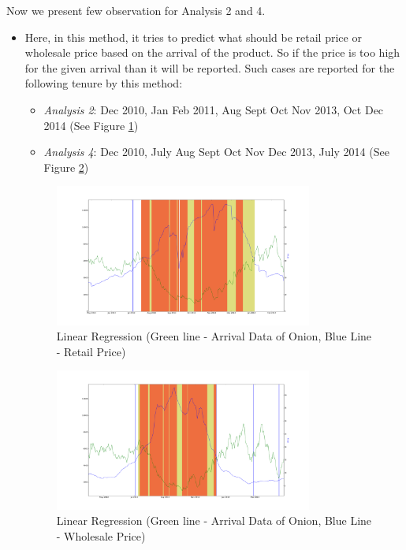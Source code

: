 \documentclass[a4paper,10pt]{report}
\begin{document}
		
		Now we present few observation for Analysis 2 and 4.
		
		
		\begin{itemize}
			\item Here, in this method, it tries to predict what should be retail price or wholesale price based on the arrival of the product. So if the price is too high for the given arrival than it will be reported.
			Such cases are reported for the following tenure by this method:
			\begin{itemize}
				\item \textit{Analysis 2}: Dec 2010, Jan Feb 2011, Aug Sept Oct Nov 2013, Oct Dec 2014 (See Figure \ref{fig:12221})
				\item \textit{Analysis 4}: Dec 2010, July Aug Sept Oct Nov Dec 2013, July 2014 (See Figure \ref{fig:12241})
			\end{itemize}
			\begin{figure}[H]
		    	\centering
  		    	\includegraphics[width=0.8\textwidth]{graphs/12221.png}
		    	\caption{Linear Regression (Green line - Arrival Data of Onion, Blue Line - Retail Price)}
		    	\label{fig:12221}
			\end{figure}
			
			\begin{figure}[H]
		    	\centering
  		    	\includegraphics[width=0.8\textwidth]{graphs/12241.png}
		    	\caption{Linear Regression (Green line - Arrival Data of Onion, Blue Line - Wholesale Price)}
		    	\label{fig:12241}
			\end{figure}
			

\end{itemize}
\end{document}

